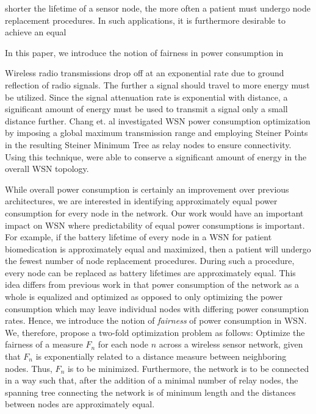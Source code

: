  shorter the lifetime of a sensor node, the more often a patient must undergo node replacement procedures. In such applications, it is furthermore desirable to achieve an equal 

 In this paper, we introduce the notion of fairness in power consumption in








Wireless radio transmissions drop off at an exponential rate due to ground reflection of radio signals. The further a signal should travel to more energy must be utilized. Since the signal attenuation rate is exponential with distance, a significant amount of energy must be used to transmit a signal only a small distance further. Chang et. al \cite{RelaySensor} investigated WSN power consumption optimization by imposing a global maximum transmission range and employing Steiner Points in the resulting Steiner Minimum Tree as relay nodes to ensure connectivity. Using this technique, \cite{RelaySensor} were able to conserve a significant amount of energy in the overall WSN topology.

While overall power consumption is certainly an improvement over previous architectures, we are interested in identifying approximately equal power consumption for every node in the network. Our work would have an important impact on WSN where predictability of equal power consumptions is important. For example, if the battery lifetime of every node in a WSN for patient biomedication is approximately equal and maximized, then a patient will undergo the fewest number of  node replacement procedures. During such a procedure, every node can be replaced as battery lifetimes are approximately equal. This idea differs from previous work in that power consumption of the network as a whole is equalized and optimized as opposed to only optimizing the power consumption which may leave individual nodes with differing power consumption rates. Hence, we introduce the notion of \textit{fairness} of power consumption in WSN. We, therefore, propose a two-fold optimization problem as follows:
Optimize the fairness of a measure $F_n$ for each node $n$ across a wireless sensor network, given that $F_n$ is exponentially related to a distance measure between neighboring nodes. Thus, $F_n$ is to be minimized. Furthermore, the network is to be connected in a way such that, after the addition of a minimal number of relay nodes, the spanning tree connecting the network is of minimum length and the distances between nodes are approximately equal.

